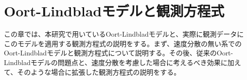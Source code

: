 






\chapter{Oort-Lindbladモデルと観測方程式 \label{chapTheory}}
この章では、本研究で用いているOort-Lindbladモデルと、実際に観測データにこのモデルを適用する観測方程式の説明をする。まず、速度分散の無い系でのOort-Lindbladモデルと観測方程式について説明する。その後、従来のOort-Lindbladモデルの問題点と、速度分散を考慮した場合に考えるべき効果に加えて、そのような場合に拡張した観測方程式の説明をする。

